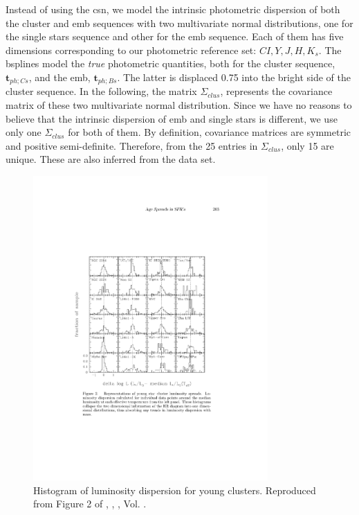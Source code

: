 Instead of using the \gls{csn}, we model the intrinsic photometric dispersion of both the cluster and \gls{emb} sequences with two multivariate normal distributions, one for the single stars sequence and other for the \gls{emb} sequence. Each of them has five dimensions corresponding to our photometric reference set: $CI,Y,J,H,K_s$. The \glspl{bspline} model the \emph{true} photometric quantities, both for the cluster sequence, $\mathbf{t}_{ph;Cs}$, and the \gls{emb}, $\mathbf{t}_{ph;Bs}$. The latter is displaced 0.75 into the bright side of the cluster sequence. In the following, the matrix $\Sigma_{clus}$, represents the covariance matrix of these two multivariate normal distribution. Since we have no reasons to believe that the intrinsic dispersion of   \gls{emb} and single stars is different, we  use only one $\Sigma_{clus}$ for both of them. By definition, covariance matrices are symmetric and positive semi-definite. Therefore, from the 25 entries in $\Sigma_{clus}$, only 15 are unique. These are also inferred from the data set.


\begin{figure}[ht!]
\begin{center}
\includegraphics[width=0.8\textwidth]{background/Figures/F2_Hillenbrand2008.pdf}
\caption{Histogram of luminosity dispersion for young clusters. Reproduced from Figure 2 of \citet{2008ASPC..384..200H}, \textit{}, , Vol. .}
\label{fig:luminosity_dispersion}
\end{center}
\end{figure}


